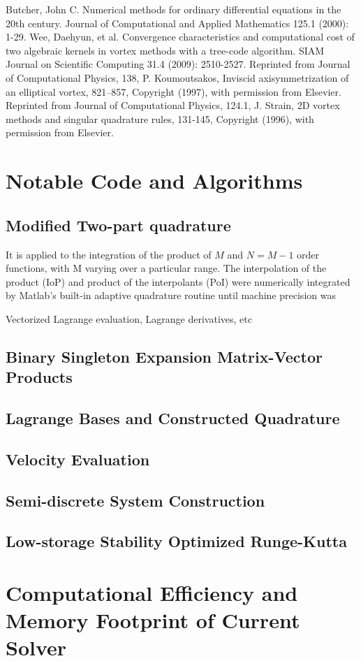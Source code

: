 \documentclass[letterpaper,12pt]{report}
\begin{document}
\begin{thebibliography}{8}
Butcher, John C. Numerical methods for ordinary differential equations in the 20th century. Journal of Computational and Applied Mathematics 125.1 (2000): 1-29.
Wee, Daehyun, et al. Convergence characteristics and computational cost of two algebraic kernels in vortex methods with a tree-code algorithm. SIAM Journal on Scientific Computing 31.4 (2009): 2510-2527.
Reprinted from  Journal of Computational Physics, 138, P. Koumoutsakos, Inviscid axisymmetrization of an elliptical vortex, 821–857, Copyright (1997), with permission from Elsevier.
Reprinted from Journal of Computational Physics, 124.1, J. Strain, 2D vortex methods and singular quadrature rules, 131-145, Copyright (1996), with permission from Elsevier.
\end{thebibliography}

\cleardoublepage
\appendix
{}
%
\chapter{Notable Code and Algorithms}\label{Algs}
\section{Modified Two-part quadrature}

It is applied to the integration of the product of $M$ and $N=M-1$ order functions, with M varying over a particular range. The interpolation of the product (IoP) and product of the interpolants (PoI) were numerically integrated by Matlab's built-in adaptive quadrature routine until machine precision was 

Vectorized Lagrange evaluation, Lagrange derivatives, etc
\newpage
\section{Binary Singleton Expansion Matrix-Vector Products}
\newpage
\section{Lagrange Bases and Constructed Quadrature}
\newpage
\section{Velocity Evaluation}
\section{Semi-discrete System Construction}
\newpage
\section{Low-storage Stability Optimized Runge-Kutta}
%
\chapter{Computational Efficiency and Memory Footprint of Current Solver}\label{Algs}

\end{document}
